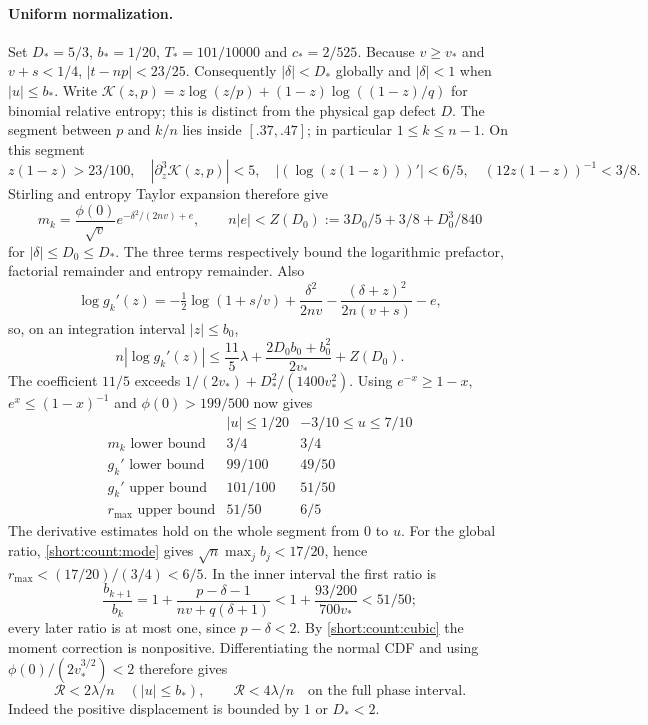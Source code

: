 \paragraph{Uniform normalization.}
Set $D_*=5/3$, $b_*=1/20$, $T_*=101/10000$ and $c_*=2/525$.
Because $v\ge v_*$ and $v+s<1/4$, $|t-np|<23/25$.
Consequently $|\delta|<D_*$ globally and $|\delta|<1$ when $|u|\le b_*$.
Write $\mathcal K(z,p)=z\log(z/p)+(1-z)\log((1-z)/q)$ for binomial
relative entropy; this is distinct from the physical gap defect $D$.
The segment between $p$ and $k/n$ lies inside $[.37,.47]$;
in particular $1\le k\le n-1$. On this segment
\[
 z(1-z)>23/100,\quad |\partial_z^3\mathcal K(z,p)|<5,\quad
 |(\log(z(1-z)))'|<6/5,\quad(12z(1-z))^{-1}<3/8.
\]
Stirling and entropy Taylor expansion therefore give
\begin{equation}\label{short:count:small-mass}
 m_k=\frac{\phi(0)}{\sqrt v}
      e^{-\delta^2/(2nv)+e},\qquad
 n|e|<Z(D_0):=3D_0/5+3/8+D_0^3/840
\end{equation}
for $|\delta|\le D_0\le D_*$. The three terms respectively bound the
logarithmic prefactor, factorial remainder and entropy remainder.
Also
\[
 \log g_k'(z)=-\tfrac12\log(1+s/v)+\frac{\delta^2}{2nv}
                         -\frac{(\delta+z)^2}{2n(v+s)}-e,
\]
so, on an integration interval $|z|\le b_0$,
\[
 n|\log g_k'(z)|\le\frac{11}{5}\lambda
                  +\frac{2D_0b_0+b_0^2}{2v_*}+Z(D_0).
\]
The coefficient $11/5$ exceeds
$1/(2v_*)+D_*^2/(1400v_*^2)$.
Using $e^{-x}\ge1-x$, $e^x\le(1-x)^{-1}$ and
$\phi(0)>199/500$ now gives
\begin{equation}\label{short:count:small-constants}
\begin{array}{c|cc}
 &|u|\le1/20&-3/10\le u\le7/10\\\hline
 m_k\text{ lower bound}&3/4&3/4\\
 g_k'\text{ lower bound}&99/100&49/50\\
 g_k'\text{ upper bound}&101/100&51/50\\
 r_{\max}\text{ upper bound}&51/50&6/5
\end{array}
\end{equation}
The derivative estimates hold on the whole segment from $0$ to $u$.
For the global ratio, \eqref{short:count:mode} gives
$\sqrt n\max_j b_j<17/20$, hence $r_{\max}<(17/20)/(3/4)<6/5$.
In the inner interval the first ratio is
\[
 \frac{b_{k+1}}{b_k}
 =1+\frac{p-\delta-1}{nv+q(\delta+1)}
 <1+\frac{93/200}{700v_*}<51/50;
\]
every later ratio is at most one, since $p-\delta<2$.
By \eqref{short:count:cubic} the moment correction is nonpositive.
Differentiating the normal CDF and using
$\phi(0)/(2v_*^{3/2})<2$ therefore gives
\begin{equation}\label{short:count:small-repair}
 \mathcal R<2\lambda/n\quad(|u|\le b_*),\qquad
 \mathcal R<4\lambda/n\quad\text{on the full phase interval}.
\end{equation}
Indeed the positive displacement is bounded by $1$ or $D_*<2$.

